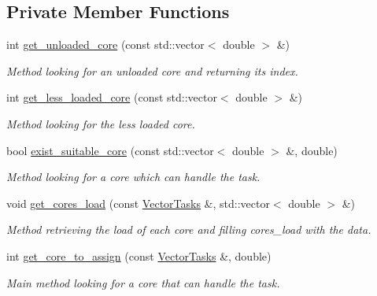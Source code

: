 \subsection*{Private Member Functions}
\begin{DoxyCompactItemize}
\item 
int \hyperlink{classSequentialScheduler_ae8af6ea6af9b34144e657e208e5bf23e}{get\-\_\-unloaded\-\_\-core} (const std\-::vector$<$ double $>$ \&)
\begin{DoxyCompactList}\small\item\em Method looking for an unloaded core and returning its index. \end{DoxyCompactList}\item 
int \hyperlink{classSequentialScheduler_a7731305cd82efe8c55af85d654996d90}{get\-\_\-less\-\_\-loaded\-\_\-core} (const std\-::vector$<$ double $>$ \&)
\begin{DoxyCompactList}\small\item\em Method looking for the less loaded core. \end{DoxyCompactList}\item 
bool \hyperlink{classSequentialScheduler_a4155dae41da7b17bee2e784e03ecad8f}{exist\-\_\-suitable\-\_\-core} (const std\-::vector$<$ double $>$ \&, double)
\begin{DoxyCompactList}\small\item\em Method looking for a core which can handle the task. \end{DoxyCompactList}\item 
void \hyperlink{classSequentialScheduler_a76d17fb75bdd0cee7284086581a18515}{get\-\_\-cores\-\_\-load} (const \hyperlink{ParallelScheduler_8h_ac7eb1fba35a2c780a99ff2d3df789884}{Vector\-Tasks} \&, std\-::vector$<$ double $>$ \&)
\begin{DoxyCompactList}\small\item\em Method retrieving the load of each core and filling cores\-\_\-load with the data. \end{DoxyCompactList}\item 
int \hyperlink{classSequentialScheduler_af4c223d08734e1daa294ae19d74ca4f1}{get\-\_\-core\-\_\-to\-\_\-assign} (const \hyperlink{ParallelScheduler_8h_ac7eb1fba35a2c780a99ff2d3df789884}{Vector\-Tasks} \&, double)
\begin{DoxyCompactList}\small\item\em Main method looking for a core that can handle the task. \end{DoxyCompactList}\end{DoxyCompactItemize}
